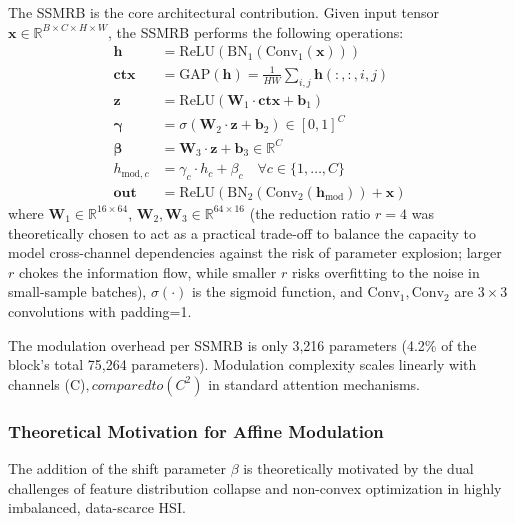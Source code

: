 \documentclass[pdflatex,sn-mathphys-num]{sn-jnl}
\theoremstyle{thmstyleone}
\theoremstyle{thmstyletwo}
\theoremstyle{thmstylethree}
\begin{document}
The SSMRB is the core architectural contribution. Given input tensor $\mathbf{x} \in \mathbb{R}^{B \times C \times H \times W}$, the SSMRB performs the following operations:
\begin{align}
\mathbf{h} &= \text{ReLU}(\text{BN}_1(\text{Conv}_1(\mathbf{x}))) \label{eq:ssmrb1} \\
\mathbf{ctx} &= \text{GAP}(\mathbf{h}) = \frac{1}{HW} \sum_{i,j} \mathbf{h}(:,:,i,j) \label{eq:ssmrb2} \\
\mathbf{z} &= \text{ReLU}(\mathbf{W}_1 \cdot \mathbf{ctx} + \mathbf{b}_1) \label{eq:ssmrb3} \\
\bm{\gamma} &= \sigma(\mathbf{W}_2 \cdot \mathbf{z} + \mathbf{b}_2) \in [0,1]^C \label{eq:ssmrb4} \\
\bm{\beta} &= \mathbf{W}_3 \cdot \mathbf{z} + \mathbf{b}_3 \in \mathbb{R}^C \label{eq:ssmrb5} \\
h_{\text{mod},c} &= \gamma_c \cdot h_c + \beta_c \quad \forall c \in \{1,\ldots,C\} \label{eq:ssmrb6} \\
\mathbf{out} &= \text{ReLU}(\text{BN}_2(\text{Conv}_2(\mathbf{h}_{\text{mod}})) + \mathbf{x}) \label{eq:ssmrb7}
\end{align}
where $\mathbf{W}_1 \in \mathbb{R}^{16 \times 64}$, $\mathbf{W}_2, \mathbf{W}_3 \in \mathbb{R}^{64 \times 16}$ (the reduction ratio $r=4$ was theoretically chosen to act as a practical trade-off to balance the capacity to model cross-channel dependencies against the risk of parameter explosion; larger $r$ chokes the information flow, while smaller $r$ risks overfitting to the noise in small-sample batches), $\sigma(\cdot)$ is the sigmoid function, and $\text{Conv}_1, \text{Conv}_2$ are $3\!\times\!3$ convolutions with padding=1.

The modulation overhead per SSMRB is only 3,216 parameters (4.2\% of the block's total 75,264 parameters). Modulation complexity scales linearly with channels (C)$, compared to (C^2)$ in standard attention mechanisms.



\subsubsection{Theoretical Motivation for Affine Modulation}

The addition of the shift parameter $\beta$ is theoretically motivated by the dual challenges of feature distribution collapse and non-convex optimization in highly imbalanced, data-scarce HSI. 
\end{document}
